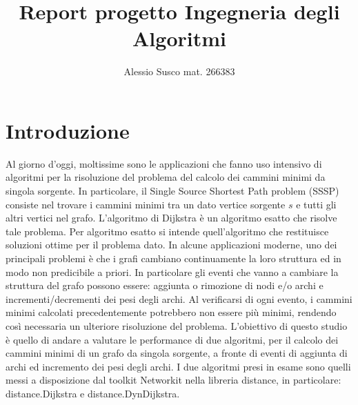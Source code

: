 \documentclass[a4paper]{article}
\begin{document}
\author{Alessio Susco mat. 266383}
\title{Report progetto Ingegneria degli Algoritmi}
\maketitle
\theoremstyle{definition}
\newtheorem{definition}{Definition}[section]
\newtheorem{theorem}{Theorem}
\section{Introduzione}
Al giorno d'oggi, moltissime sono le applicazioni che fanno uso intensivo di algoritmi per la risoluzione del problema del calcolo dei cammini minimi da singola sorgente.
In particolare, il Single Source Shortest Path problem (SSSP) consiste nel trovare i cammini minimi tra un dato vertice sorgente $s$ e tutti gli altri vertici nel grafo.
L'algoritmo di Dijkstra è un algoritmo esatto che risolve tale problema. Per algoritmo esatto si intende quell'algoritmo che restituisce soluzioni ottime per il problema dato.
In alcune applicazioni moderne, uno dei principali problemi è che i grafi cambiano continuamente la loro struttura ed in modo non predicibile a priori. In particolare gli eventi che vanno a cambiare la struttura del grafo possono essere: aggiunta o rimozione di nodi e/o archi e incrementi/decrementi dei pesi degli archi. Al verificarsi di ogni evento, i cammini minimi calcolati precedentemente potrebbero non essere più minimi, rendendo così necessaria un ulteriore risoluzione del problema.
L'obiettivo di questo studio è quello di andare a valutare le performance di due algoritmi, per il calcolo dei cammini minimi di un grafo da singola sorgente, a fronte di eventi di aggiunta di archi ed incremento dei pesi degli archi.
I due algoritmi presi in esame sono quelli messi a disposizione dal toolkit Networkit nella libreria distance, in particolare: distance.Dijkstra e distance.DynDijkstra.
\end{document}
